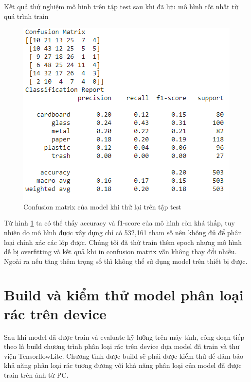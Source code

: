 Kết quả thử nghiệm mô hình trên tập test sau khi đã lưu mô hình tốt nhất từ quá trình train 
\begin{figure}[H]
    \centering
    \includegraphics[width=\linewidth]{images/Quanh/matrix.png}
    \caption{ Confusion matrix của model khi thử lại trên tập test}
    \label{fig:matrix}
\end{figure}
Từ hình \ref{fig:matrix} ta có thể thấy accuracy và f1-score của mô hình còn khá thấp, tuy nhiên do mô hình được xây dựng chỉ có 532,161 tham số nên không đủ để phân loại chính xác các lớp được. Chúng tôi đã thử train thêm epoch nhưng mô hình dễ bị overfitting và kết quả khi in confusion matrix vẫn không thay đổi nhiều. Ngoài ra nếu tăng thêm trọng số thì không thể sử dụng model trên thiết bị được.


\section{Build và kiểm thử model phân loại rác trên device}
Sau khi model đã được train và evaluate kỹ lưỡng trên máy tính, công đoạn tiếp theo là build chương trình phân loại rác trên device dựa model đã train và thư viện TensorflowLite. 
Chương tình được build sẽ phải được kiểm thử để đảm bảo khả năng phân loại rác tương đương với khả năng phân loại của model đã được train trên ảnh từ PC.

